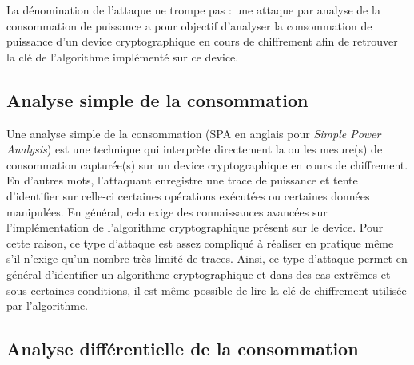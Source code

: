 \documentclass[oneside]{book}
\begin{document}
La dénomination de l'attaque ne trompe pas : une attaque par analyse de la consommation de puissance a pour objectif d'analyser la consommation de puissance d'un device cryptographique en cours de chiffrement afin de retrouver la clé de l'algorithme implémenté sur ce device.

\subsection{Analyse simple de la consommation}
\label{sec:SPA}

Une analyse simple de la consommation (SPA en anglais pour \textit{Simple Power Analysis}) est une technique qui interprète directement la ou les mesure(s) de consommation capturée(s) sur un device cryptographique en cours de chiffrement. En d'autres mots, l'attaquant enregistre une trace de puissance et tente d'identifier sur celle-ci certaines opérations exécutées ou certaines données manipulées. En général, cela exige des connaissances avancées sur l'implémentation de l'algorithme cryptographique présent sur le device. Pour cette raison, ce type d'attaque est assez compliqué à réaliser en pratique même s'il n'exige qu'un nombre très limité de traces. Ainsi, ce type d'attaque permet en général d'identifier un algorithme cryptographique et dans des cas extrêmes et sous certaines conditions, il est même possible de lire la clé de chiffrement utilisée par l'algorithme.


\subsection{Analyse différentielle de la consommation}
\label{sec:DPA}
\end{document}
